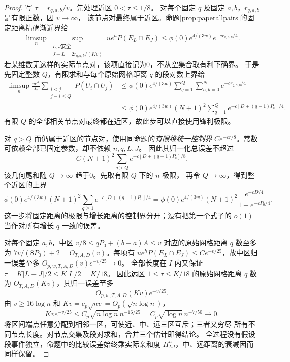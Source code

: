 \documentclass[UTF8,a4paper,11pt,fontset=fandol]{ctexart}
\theoremstyle{remark}
\begin{document}
\begin{proof}
写 $\tau=r_{q,a,b}/v$。先处理近区 $0<\tau\le1/8$。
对每个固定 $q$ 及固定 $a,b$，$r_{q,a,b}$ 是有限正数，因 $v\to\infty$，
该节点对最终属于近区。命题\ref{prop:paperallpairs}的固定距离精确渐近界给
\[
 \limsup_n\sup_{
 \substack{L,J\text{安全}\\J-L=2r_{q,a,b}/(Kv)}}
 ue^hP(E_L\cap E_J)
 \le\phi(0)e^{4/(3w)}e^{-cr_{q,a,b}/4}.
\]
若某维数无这样的实际节点对，该项直接记为0，不从空集合取有利下确界。
于是先固定整数 $Q$，有限求和与每个原始网格距离 $q$ 的段对数上界给
\begin{align*}
 \limsup_n\frac{ue^h}{J_*}
 \sum_{\substack{i<j\\j-i\le Q}}P(U_i\cap U_j)
 &\le\phi(0)e^{4/(3w)}
 \sum_{q=1}^Q\sum_{a,b=0}^Ne^{-cr_{q,a,b}/4}\\
 &\le\phi(0)e^{4/(3w)}(N+1)^2
 \sum_{q=1}^Qe^{-c[D+(q-1)P_0]/4}.
\end{align*}
有限 $Q$ 的全部相关节点对最终都在近区，故此步可以直接使用锋利极限。

对 $q>Q$ 而仍属于近区的节点对，使用同命题的\emph{有限维统一控制界}
$Ce^{-cr/8}$。常数可依赖全部已固定参数，却不依赖 $n,q,L,J$。
因此其归一化总误差不超过
\[
 C(N+1)^2\sum_{q>Q}e^{-c[D+(q-1)P_0]/8}.
\]
该几何尾和随 $Q\to\infty$ 趋于0。先取有限 $Q$ 下的 $n$ 极限，
再令 $Q\to\infty$，得到整个近区的上界
\[
 \phi(0)e^{4/(3w)}(N+1)^2
 \sum_{q\ge1}e^{-c[D+(q-1)P_0]/4}
 =\phi(0)e^{4/(3w)}(N+1)^2
 \frac{e^{-cD/4}}{1-e^{-cP_0/4}}.
\]
这一步将固定距离的极限与增长距离的控制界分开；没有把第一个式子的
$o(1)$ 当作对所有增长 $q$ 一致的误差。

对每个固定 $a,b$，中区 $v/8\le qP_0+(b-a)A\le v$ 对应的原始网格距离 $q$
数至多为 $7v/(8P_0)+2=O_{T,A,D}(v)$。每项有
$ue^hP(E_L\cap E_J)\le Ce^{-v/25}$，故中区归一误差至多
$O_{p,w,T,A,D}(v)e^{-v/25}\to0$。
全部长度在 $I$ 内又保证
$\tau=K|L-J|/2\le K|I|/2=K/18$。
因此远区 $1\le\tau\le K/18$ 的原始网格距离 $q$ 数为
$O_{T,A,D}(Kv)$，其归一误差至多
\[
 O_{p,w,T,A,D}(Kv)e^{-v/25}.
\]
由 $v\ge16\log n$ 和 $Kv=c_p\sqrt{nv}=O_p(\sqrt{n\log n})$，
\[
 Kv e^{-v/25}
 \le C_p\sqrt{n\log n}\,n^{-16/25}
 =C_p\sqrt{\log n}\,n^{-7/50}\longrightarrow0.
\]
将区间端点任意分配到相邻一区，可使近、中、远三区互斥；三者又穷尽
所有不同节点长度。对节点交集及段对求和，合并三个估计即得结论。
全过程没有假设段事件独立，命题中的比较误差始终乘实际亲和度
$H_{LJ}^n$，中、远距离的衰减因而同样保留。
\end{proof}
\end{document}
